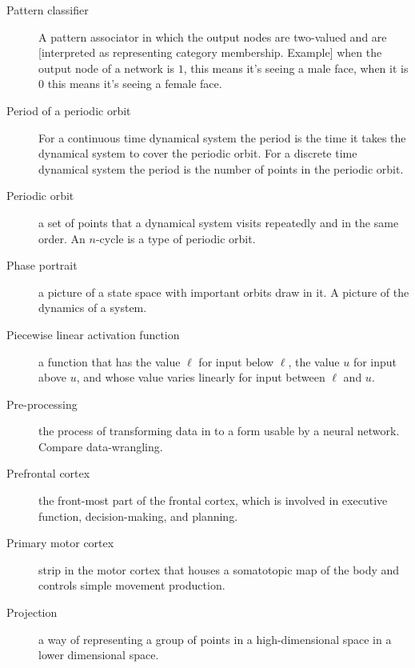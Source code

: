 \begin{description}

\item[Pattern classifier] A pattern associator in which the output nodes are two-valued and are [interpreted as representing category membership. Example] when the output node of a network is $1$, this means it's seeing a male face, when it is $0$ this means it's seeing a female face.


\item[Period of a periodic orbit] For a continuous time dynamical system the period is the time it takes the dynamical system to cover the periodic orbit. For a discrete time dynamical system the period is the number of points in the periodic orbit.

\item[Periodic orbit] a set of points that a dynamical system visits repeatedly and in the same order. An $n$-cycle is a type of periodic orbit.

\item[Phase portrait] a picture of a state space with important orbits draw in it. A picture of the dynamics of a system.

\item[Piecewise linear activation function] a function that has the value $\ell$ for input below $\ell$, the value $u$ for input above $u$, and whose  value varies linearly for input between $\ell$ and $u$. 

\item[Pre-processing] the process of transforming data in to a form usable by a neural network. Compare data-wrangling.


\item[Prefrontal cortex] the front-most part of the frontal cortex, which is involved in executive function, decision-making, and planning. 

\item[Primary motor cortex] strip in the motor cortex that houses a somatotopic map of the body and controls simple movement production. 

\item[Projection] a way of representing a group of points in a high-dimensional space in a lower dimensional space.


\end{description}
